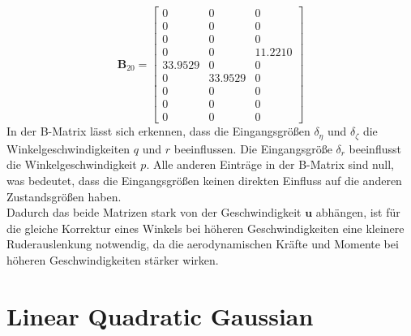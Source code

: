 \begin{equation}
\mathbf{B}_{20} =
\begin{bmatrix}
    0 & 0 & 0 \\
    0 & 0 & 0 \\
    0 & 0 & 0 \\
    0 & 0 & 11.2210 \\
    33.9529 & 0 & 0 \\
    0 & 33.9529 & 0 \\
    0 & 0 & 0 \\
    0 & 0 & 0 \\
    0 & 0 & 0
\end{bmatrix}
\end{equation}
In der B-Matrix lässt sich erkennen, dass die Eingangsgrößen $\delta_\eta$ und $\delta_\zeta$ die Winkelgeschwindigkeiten $q$ und $r$ beeinflussen. Die Eingangsgröße $\delta_r$ beeinflusst die Winkelgeschwindigkeit $p$. Alle anderen Einträge in der B-Matrix sind null, was bedeutet, dass die Eingangsgrößen keinen direkten Einfluss auf die anderen Zustandsgrößen haben.
\\
Dadurch das beide Matrizen stark von der Geschwindigkeit $\mathbf{u}$ abhängen, ist für die gleiche Korrektur eines Winkels bei höheren Geschwindigkeiten eine kleinere Ruderauslenkung notwendig, da die aerodynamischen Kräfte und Momente bei höheren Geschwindigkeiten stärker wirken. 
\section{Linear Quadratic Gaussian}
\label{sec:lqg}

